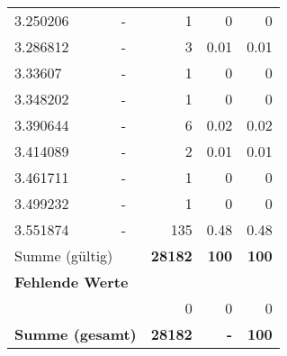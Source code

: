 \begin{longtable}{lXrrr}
        3.250206 & \multicolumn{1}{X}{-} & %
          \num{1} &
          \num[round-mode=places,round-precision=2]{0} &
          \num[round-mode=places,round-precision=2]{0} \\

        3.286812 & \multicolumn{1}{X}{-} & %
          \num{3} &
          \num[round-mode=places,round-precision=2]{0.01} &
          \num[round-mode=places,round-precision=2]{0.01} \\

        3.33607 & \multicolumn{1}{X}{-} & %
          \num{1} &
          \num[round-mode=places,round-precision=2]{0} &
          \num[round-mode=places,round-precision=2]{0} \\

        3.348202 & \multicolumn{1}{X}{-} & %
          \num{1} &
          \num[round-mode=places,round-precision=2]{0} &
          \num[round-mode=places,round-precision=2]{0} \\

        3.390644 & \multicolumn{1}{X}{-} & %
          \num{6} &
          \num[round-mode=places,round-precision=2]{0.02} &
          \num[round-mode=places,round-precision=2]{0.02} \\

        3.414089 & \multicolumn{1}{X}{-} & %
          \num{2} &
          \num[round-mode=places,round-precision=2]{0.01} &
          \num[round-mode=places,round-precision=2]{0.01} \\

        3.461711 & \multicolumn{1}{X}{-} & %
          \num{1} &
          \num[round-mode=places,round-precision=2]{0} &
          \num[round-mode=places,round-precision=2]{0} \\

        3.499232 & \multicolumn{1}{X}{-} & %
          \num{1} &
          \num[round-mode=places,round-precision=2]{0} &
          \num[round-mode=places,round-precision=2]{0} \\

        3.551874 & \multicolumn{1}{X}{-} & %
          \num{135} &
          \num[round-mode=places,round-precision=2]{0.48} &
          \num[round-mode=places,round-precision=2]{0.48} \\

     \midrule
     \multicolumn{2}{l}{Summe (gültig)} &
       \textbf{\num{28182}} &
     \textbf{\num{100}} &
       \textbf{\num[round-mode=places,round-precision=2]{100}} \\
     \multicolumn{5}{l}{\textbf{Fehlende Werte}}\\
      & & 0 & 0 & 0 \\
     \midrule
     \multicolumn{2}{l}{\textbf{Summe (gesamt)}} &
          \textbf{\num{28182}} &
        \textbf{-} &
        \textbf{\num{100}} \\
     \bottomrule
     \end{longtable}
     
